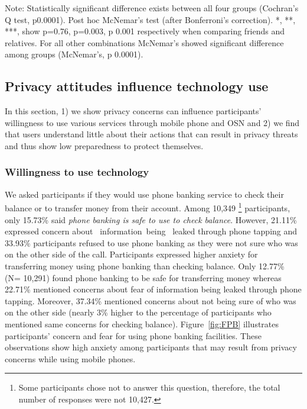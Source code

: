 \begin{table}[!htbp]
\begin{tabular}{p{2.1cm}p{1cm}p{1 cm}p{1.2cm}p{0.9cm}}
\midrule
   \midrule
    \end{tabular}\begin{tablenotes}
 \item{Note: Statistically significant difference exists between all four groups (Cochran's Q test, p0.0001). Post hoc McNemar's test (after Bonferroni's correction). *, **, ***, show p=0.76, p=0.003, p  0.001 respectively when comparing friends and relatives. For all other combinations McNemar's showed significant difference among groups (McNemar's, p  0.0001).}
  \end{tablenotes}
    \vspace{-4mm}
  \label{tab:pi2013:familyprivacy}\end{table}

\vspace{-1mm}
\subsection{ Privacy attitudes influence technology use}
In this section, 1) we show privacy concerns can influence participants' willingness to use various services through mobile phone and OSN and 2) we find that users understand little about their actions that can result in privacy threats and thus show low preparedness to protect themselves.
\vspace{-1.5mm}
\subsubsection{Willingness to use technology}
We asked participants if they would use phone banking service to check their balance or to transfer money from their account. Among 10,349 \footnote{Some participants chose not to answer this question, therefore, the total number of responses were not 10,427.} participants, only 15.73\% said \emph{phone banking is safe to use to check balance}. However, 21.11\% expressed concern about ~information~being ~leaked through phone tapping and  33.93\% participants refused to use phone banking as they were not sure who was on the other side of the call. Participants expressed higher anxiety for transferring money using phone banking than checking balance. Only 12.77\% (N= 10,291) found phone banking to be safe for transferring money whereas 22.71\% mentioned concerns about fear of information being leaked through phone tapping. Moreover, 37.34\% mentioned concerns about not being sure of who was on the other side (nearly 3\% higher to the percentage of participants who mentioned same concerns for checking balance). Figure~\ref{fig:FPB} illustrates participants' concern and fear for using phone banking facilities. These observations show high anxiety among participants that may result from privacy concerns while using mobile phones.      


